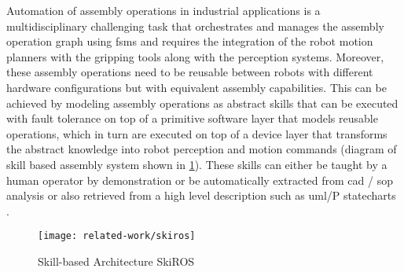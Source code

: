 Automation of assembly operations in industrial applications \cite{Thomas2001,Patel2012} is a multidisciplinary challenging task that orchestrates and manages the assembly operation graph using \glspl{fsm} \cite{Smits2010,Stefan2014} and requires the integration of the robot motion planners with the gripping tools \cite{Thomas2015} along with the perception systems. Moreover, these assembly operations need to be reusable \cite{Butting2016,Andersen2014} between robots with different hardware configurations \cite{Thomas2002} but with equivalent assembly capabilities. This can be achieved by modeling assembly operations as abstract skills \cite{Holz2015,aimm2012,Pedersen2014} that can be executed with fault tolerance \cite{ThomasICRA2003} on top of a primitive software layer that models reusable operations, which in turn are executed on top of a device layer that transforms the abstract knowledge into robot perception and motion commands (diagram of skill based assembly system shown in \cref{fig:skiros}). These skills can either be taught by a human operator by demonstration or be automatically extracted from \gls{cad} / \gls{sop} analysis \cite{Lavoue2005,Tenorth2013cad} or also retrieved from a high level description such as \gls{uml}/P statecharts \cite{ThomasICRA2013}.


\begin{figure}[H]
	\centering
	\texttt{[image: related-work/skiros]}
	\caption[Skill-based Architecture SkiROS]{Skill-based Architecture SkiROS \cite{Holz2015}}
	\label{fig:skiros}
\end{figure}




